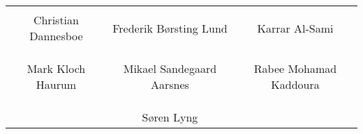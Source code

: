 \phantom{Luft}

\phantom{Luft}

\begin{table}[H]
	\centering
		\begin{tabular}{c c c}
			\underline{\phantom{mmmmmmmmmmmmmm}} & \underline{\phantom{mmmmmmmmmmmmmm}} & \underline{\phantom{mmmmmmmmmmmmmm}} \\
			Christian Dannesboe			& Frederik Børsting Lund 		& Karrar Al-Sami 			\\
			&&\\
			&&\\
			\underline{\phantom{mmmmmmmmmmmmmm}} & \underline{\phantom{mmmmmmmmmmmmmm}} & \underline{\phantom{mmmmmmmmmmmmmm}} \\
			Mark Kloch Haurum			& Mikael Sandegaard Aarsnes 		& Rabee Mohamad Kaddoura 				\\
			&&\\
			&&\\
		 							& \underline{\phantom{mmmmmmmmmmmmmm}} 	&			\\														
									& Søren Lyng 							& 												
		\end{tabular}
\end{table}
\newpage